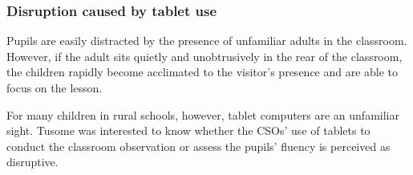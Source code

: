\documentclass[11pt]{article}
\begin{document}
    \hypertarget{disruption-caused-by-tablet-use}{%
\subsubsection{Disruption caused by tablet
use}\label{disruption-caused-by-tablet-use}}

Pupils are easily distracted by the presence of unfamiliar adults in the
classroom. However, if the adult sits quietly and unobtrusively in the
rear of the classroom, the children rapidly become acclimated to the
visitor's presence and are able to focus on the lesson.

For many children in rural schools, however, tablet computers are an
unfamiliar sight. Tusome was interested to know whether the CSOs' use of
tablets to conduct the classroom observation or assess the pupils'
fluency is perceived as disruptive.
\end{document}
